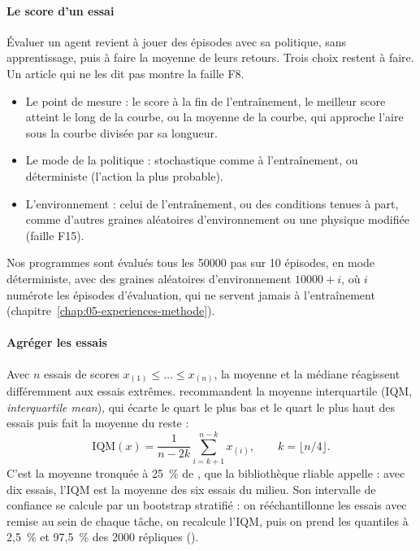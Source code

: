 \paragraph{Le score d'un essai}
Évaluer un agent revient à jouer des épisodes avec sa politique, sans apprentissage, puis à faire la
moyenne de leurs retours. Trois choix restent à faire. Un article qui ne les dit pas montre la faille F8.
\begin{itemize}
  \item Le point de mesure : le score à la fin de l'entraînement, le meilleur score atteint le long de
  la courbe, ou la moyenne de la courbe, qui approche l'aire sous la courbe divisée par sa longueur.
  \item Le mode de la politique : stochastique comme à l'entraînement, ou déterministe (l'action la
  plus probable).
  \item L'environnement : celui de l'entraînement, ou des conditions tenues à part, comme d'autres
  graines aléatoires d'environnement ou une physique modifiée (faille F15).
\end{itemize}
Nos programmes sont évalués tous les \num{50000} pas sur 10 épisodes, en mode déterministe, avec des
graines aléatoires d'environnement $\num{10000} + i$, où $i$ numérote les épisodes d'évaluation, qui ne servent
jamais à l'entraînement (chapitre~\ref{chap:05-experiences-methode}).

\paragraph{Agréger les essais}
Avec $n$ essais de scores $x_{(1)} \leq \dots \leq x_{(n)}$, la moyenne et la médiane réagissent
différemment aux essais extrêmes. \textcite{agarwal2021precipice} recommandent la moyenne interquartile
(IQM, \emph{interquartile mean}), qui écarte le quart le plus bas et le quart le plus haut des essais
puis fait la moyenne du reste :
\begin{equation}
  \mathrm{IQM}(x) = \frac{1}{n - 2k} \sum_{i = k + 1}^{n - k} x_{(i)}, \qquad k = \lfloor n/4 \rfloor .
\end{equation}
C'est la moyenne tronquée à 25~\% de , que la bibliothèque rliable
appelle : avec dix essais, l'IQM est la moyenne des six essais du milieu. Son intervalle de confiance
se calcule par un bootstrap stratifié : on rééchantillonne les essais avec remise au sein de chaque
tâche, on recalcule l'IQM, puis on prend les quantiles à 2,5~\% et 97,5~\% des \num{2000} répliques
().


